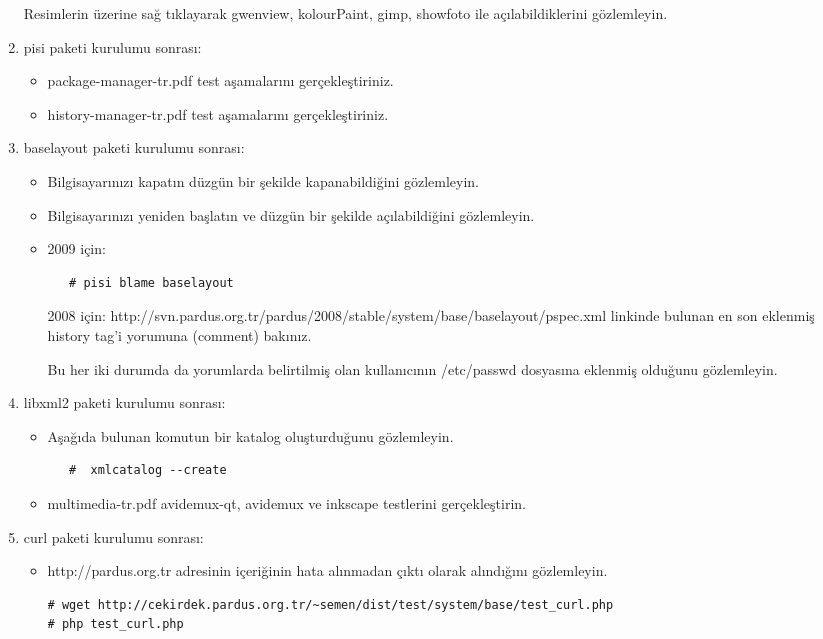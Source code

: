 \documentclass[a4paper,10pt]{article}
\begin{document}
\begin{enumerate}
Resimlerin üzerine sağ tıklayarak gwenview, kolourPaint, gimp, showfoto ile açılabildiklerini gözlemleyin.
\item pisi paketi kurulumu sonrası:
\begin{itemize}
 \item package-manager-tr.pdf test aşamalarını gerçekleştiriniz.
 \item history-manager-tr.pdf test aşamalarını gerçekleştiriniz.
\end{itemize}
\item baselayout paketi kurulumu sonrası:
\begin{itemize}
 \item Bilgisayarınızı kapatın düzgün bir şekilde kapanabildiğini gözlemleyin.
 \item Bilgisayarınızı yeniden başlatın ve düzgün bir şekilde açılabildiğini gözlemleyin.
 \item 2009 için:
  \begin{verbatim}
   # pisi blame baselayout
  \end{verbatim}
      2008 için: http://svn.pardus.org.tr/pardus/2008/stable/system/base/baselayout/pspec.xml linkinde bulunan en son eklenmiş history tag'i yorumuna (comment) bakınız.

   Bu her iki durumda da yorumlarda belirtilmiş olan kullanıcının /etc/passwd dosyasına eklenmiş olduğunu gözlemleyin.

\end{itemize}
\item libxml2 paketi kurulumu sonrası:

\begin{itemize}
\item Aşağıda bulunan komutun bir katalog oluşturduğunu gözlemleyin.
  \begin{verbatim}
   #  xmlcatalog --create
  \end{verbatim}
\item multimedia-tr.pdf avidemux-qt, avidemux ve inkscape testlerini gerçekleştirin.
\end{itemize}
\item curl paketi kurulumu sonrası:

\begin{itemize}
\item http://pardus.org.tr adresinin içeriğinin hata alınmadan çıktı olarak alındığını gözlemleyin.
\begin{verbatim}
# wget http://cekirdek.pardus.org.tr/~semen/dist/test/system/base/test_curl.php
# php test_curl.php
\end{verbatim}


\end{itemize}
\end{enumerate}
\end{document}
